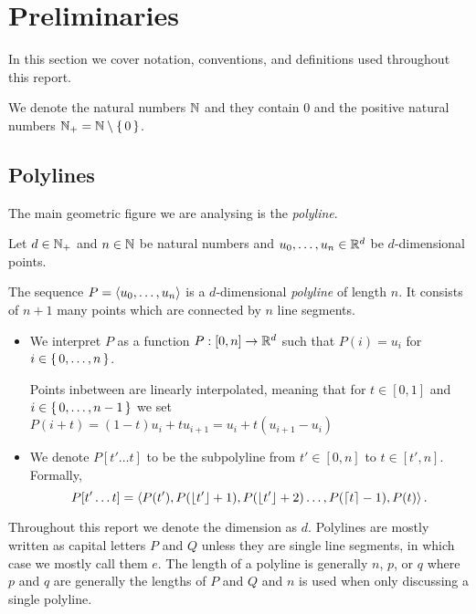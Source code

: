 \section{Preliminaries}
\label{sec:preliminaries}

In this section we cover notation, conventions, and definitions used throughout this report.  

We denote the natural numbers \(\mathbb{N}\) and they contain \(0\) and the positive natural numbers \(\mathbb{N}_+ = \mathbb{N} \setminus\set{0}\).

\subsection{Polylines}
\label{ssec:polylines}
The main geometric figure we are analysing is the \emph{polyline}.
\begin{definition}[Polyline]
  Let \(d\in \mathbb{N}_+\) and \(n \in \mathbb{N}\) be natural numbers and \(u_0, \dots, u_n \in \mathbb{R}^d\) be \(d\)-dimensional points. 

  The sequence \(P = \left\langle u_0, \dots, u_n\right\rangle\) is a \(d\)-dimensional \emph{polyline} of length \(n\). It consists of \(n+1\) many points which are connected by \(n\) line segments. 

  \begin{itemize}
    \item We interpret \(P\) as a function \(P:[0,n] \to \mathbb{R}^d\) such that \(P(i) = u_i\) for \(i \in \set{0, \dots, n}\).

      Points inbetween are linearly interpolated, meaning that for \(t \in [0, 1]\) and \(i \in \set{0, \dots, n - 1}\) we set \(P(i + t) = (1- t)u_i + t u_{i+1} = u_i + t(u_{i+1} - u_i)\)
    \item We denote \(P[t'\dots t]\) to be the subpolyline from \(t' \in [0, n]\) to \(t \in [t', n]\). Formally, \[P[t'\dots t] = \left\langle P(t'), P(\left\lfloor t'\right\rfloor + 1),  P(\left\lfloor t'\right\rfloor + 2) \dots, P(\left\lceil t\right\rceil - 1), P(t)\right\rangle.\]
  \end{itemize}

\end{definition}
Throughout this report we denote the dimension as \(d\). Polylines are mostly written as capital letters \(P\) and \(Q\) unless they are single line segments, in which case we mostly call them \(e\). The length of a polyline is generally \(n\), \(p\), or \(q\) where \(p\) and \(q\) are generally the lengths of \(P\) and \(Q\) and \(n\) is used when only discussing a single polyline.


